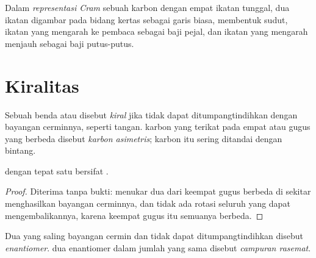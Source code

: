 \begin{definition}\label{def:g12:stereochemistry:cram}
Dalam \emph{representasi Cram} sebuah 
karbon dengan empat ikatan tunggal, dua ikatan digambar pada bidang
kertas sebagai garis biasa, membentuk sudut, ikatan yang mengarah ke
pembaca sebagai baji pejal, dan ikatan yang mengarah menjauh sebagai
baji putus-putus.
\end{definition}

\section{Kiralitas}

\begin{definition}\label{def:g12:stereochemistry:chiral}
Sebuah benda atau  disebut \emph{kiral} jika tidak
dapat ditumpangtindihkan dengan bayangan cerminnya, seperti tangan.
 karbon yang terikat pada empat  atau gugus yang berbeda
disebut \emph{karbon asimetris}; karbon itu
sering ditandai dengan bintang.
\end{definition}

\begin{proposition}\label{prop:g12:stereochemistry:one-carbon}
 dengan tepat satu  bersifat .
\end{proposition}

\begin{proof}
Diterima tanpa bukti: menukar dua dari keempat gugus berbeda di sekitar
 menghasilkan bayangan cerminnya, dan tidak ada rotasi
seluruh  yang dapat mengembalikannya, karena keempat gugus itu
semuanya berbeda.
\end{proof}

\begin{definition}\label{def:g12:stereochemistry:enantiomer}
Dua  yang saling bayangan cermin dan tidak dapat
ditumpangtindihkan disebut \emph{enantiomer}.
 dua enantiomer dalam jumlah yang sama disebut
\emph{campuran rasemat}.
\end{definition}

